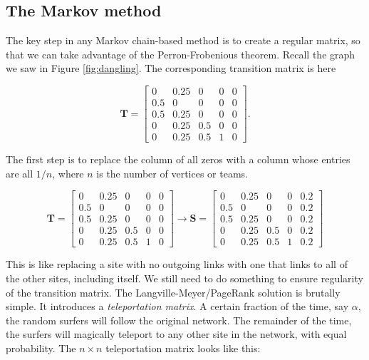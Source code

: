 \documentclass[
]{book}
\theoremstyle{definition}
\theoremstyle{definition}
\theoremstyle{definition}
\theoremstyle{definition}
\theoremstyle{remark}
\begin{document}
\subsection*{The Markov method}\label{the-markov-method}

The key step in any Markov chain-based method is to create a regular matrix, so that we can take advantage of the Perron-Frobenious theorem. Recall the graph we saw in Figure \ref{fig:dangling}. The corresponding transition matrix is here

\[\mathbf{T}=\begin{bmatrix} 0 & 0.25 & 0 & 0 & 0\\
0.5 & 0 & 0 & 0 & 0\\
0.5 & 0.25 & 0 & 0 & 0\\
0 & 0.25 & 0.5 & 0 & 0\\0 & 0.25 & 0.5 & 1 & 0\end{bmatrix}.\]

The first step is to replace the column of all zeros with a column whose entries are all \(1/n\), where \(n\) is the number of vertices or teams.

\[\mathbf{T}=\begin{bmatrix} 0 & 0.25 & 0 & 0 & 0\\
0.5 & 0 & 0 & 0 & 0\\
0.5 & 0.25 & 0 & 0 & 0\\
0 & 0.25 & 0.5 & 0 & 0\\0 & 0.25 & 0.5 & 1 & 0\end{bmatrix}\to \mathbf{S}=\begin{bmatrix} 0 & 0.25 & 0 & 0 & 0.2\\
0.5 & 0 & 0 & 0 & 0.2\\
0.5 & 0.25 & 0 & 0 & 0.2\\
0 & 0.25 & 0.5 & 0 & 0.2\\0 & 0.25 & 0.5 & 1 & 0.2\end{bmatrix}\]

This is like replacing a site with no outgoing links with one that links to all of the other sites, including itself. We still need to do something to ensure regularity of the transition matrix. The Langville-Meyer/PageRank solution is brutally simple. It introduces a \emph{teleportation matrix}. A certain fraction of the time, say \(\alpha\), the random surfers will follow the original network. The remainder of the time, the surfers will magically teleport to any other site in the network, with equal probability. The \(n\times n\) teleportation matrix looks like this:
\end{document}
